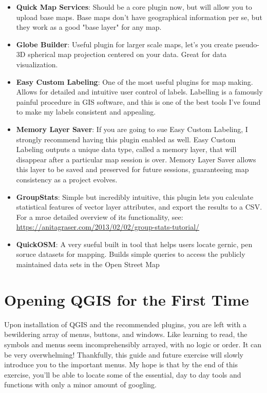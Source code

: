 \documentclass{article}
\begin{document}
\begin{itemize}
    \item \textbf{Quick Map Services}: Should be a core plugin now, but will allow you to upload base maps. Base maps don't have geographical information per se, but they work as a good "base layer" for any map.
    \item \textbf{Globe Builder}: Useful plugin for larger scale maps, let's you create pseudo-3D spherical map projection centered on your data. Great for data visualization.
    \item \textbf{Easy Custom Labeling}: One of the most useful plugins for map making. Allows for detailed and intuitive user control of labels. Labelling is a famously painful procedure in GIS software, and this is one of the best tools I've found to make my labels consistent and appealing.
    \item \textbf{Memory Layer Saver}: If you are going to sue Easy Custom Labeling, I strongly recommend having this plugin enabled as well. Easy Custom Labeling outputs a unique data type, called a memory layer, that will disappear after a particular map session is over. Memory Layer Saver allows this layer to be saved and preserved for future sessions, guaranteeing map consistency as a project evolves.
    \item \textbf{GroupStats}: Simple but incredibly intuitive, this plugin lets you calculate statistical features of vector layer attributes, and export the results to a CSV. For a mroe detailed overview of its functionality, see: \href{https://anitagraser.com/2013/02/02/group-stats-tutorial/}{https://anitagraser.com/2013/02/02/group-stats-tutorial/}
    \item \textbf{QuickOSM}: A very sueful built in tool that helps users locate gernic, pen soruce datasets for mapping. Builds simple queries to access the publicly maintained data sets in the Open Street Map 
\end{itemize}

\section{Opening QGIS for the First Time}

Upon installation of QGIS and the recommended plugins, you are left with a bewildering array of menus, buttons, and windows. Like learning to read, the symbols and menus seem incomprehensibly arrayed, with no logic or order. It can be very overwhelming! Thankfully, this guide and future exercise will slowly introduce you to the important menus. My hope is that by the end of this exercise, you'll be able to locate some of the essential, day to day tools and functions with only a minor amount of googling. 
\end{document}
